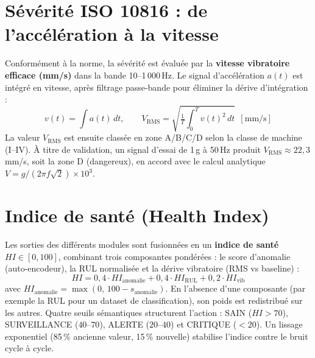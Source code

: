 \section{Sévérité ISO 10816 : de l'accélération à la vitesse}
Conformément à la norme, la sévérité est évaluée par la \textbf{vitesse vibratoire efficace
(mm/s)} dans la bande 10--1\,000\,Hz. Le signal d'accélération $a(t)$ est intégré en
vitesse, après filtrage passe-bande pour éliminer la dérive d'intégration :
\begin{equation}
v(t) = \int a(t)\,dt, \qquad
V_{\text{RMS}} = \sqrt{\tfrac{1}{T}\textstyle\int_0^T v(t)^2\,dt}\ \ [\text{mm/s}]
\end{equation}
La valeur $V_{\text{RMS}}$ est ensuite classée en zone A/B/C/D selon la classe de machine
(I--IV). À titre de validation, un signal d'essai de 1\,g à 50\,Hz produit
$V_{\text{RMS}} \approx 22{,}3$\,mm/s, soit la zone D (dangereux), en accord avec le calcul
analytique $V = g/(2\pi f \sqrt{2}) \times 10^3$.

\section{Indice de santé (Health Index)}
Les sorties des différents modules sont fusionnées en un \textbf{indice de santé} $HI \in
[0,100]$, combinant trois composantes pondérées : le score d'anomalie (auto-encodeur), la
RUL normalisée et la dérive vibratoire (RMS vs baseline) :
\begin{equation}
HI = 0{,}4\cdot HI_{\text{anomalie}} + 0{,}4\cdot HI_{\text{RUL}} + 0{,}2\cdot HI_{\text{vib}}
\label{eq:hi}
\end{equation}
avec $HI_{\text{anomalie}} = \max(0,\,100 - s_{\text{anomalie}})$. En l'absence d'une
composante (par exemple la RUL pour un dataset de classification), son poids est redistribué
sur les autres. Quatre seuils sémantiques structurent l'action : SAIN ($HI>70$),
SURVEILLANCE ($40$--$70$), ALERTE ($20$--$40$) et CRITIQUE ($<20$). Un lissage exponentiel
(85\,\% ancienne valeur, 15\,\% nouvelle) stabilise l'indice contre le bruit cycle à cycle.

